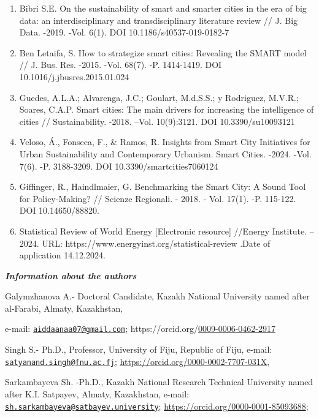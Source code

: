 {\begin{enumerate}
\def\labelenumi{\arabic{enumi}.}
\setcounter{enumi}{22}
\item
  Bibri S.E. On the sustainability of smart and smarter cities in the
  era of big data: an interdisciplinary and transdisciplinary literature
  review // J. Big Data. -2019. -Vol. 6(1). DOI
  10.1186/s40537-019-0182-7
\item
  Ben Letaifa, S. How to strategize smart cities: Revealing the SMART
  model // J. Bus. Res. -2015. -Vol. 68(7). -P. 1414-1419. DOI
  10.1016/j.jbusres.2015.01.024
\item
  Guedes, A.L.A.; Alvarenga, J.C.; Goulart, M.d.S.S.; y Rodriguez,
  M.V.R.; Soares, C.A.P. Smart cities: The main drivers for increasing
  the intelligence of cities // Sustainability. -2018. --Vol.
  10(9):3121. DOI 10.3390/su10093121
\item
  Veloso, Á., Fonseca, F., \& Ramos, R. Insights from Smart City
  Initiatives for Urban Sustainability and Contemporary Urbanism. Smart
  Cities. -2024. -Vol. 7(6). -P. 3188-3209. DOI
  10.3390/smartcities7060124
\item
  Giffinger, R., Haindlmaier, G. Benchmarking the Smart City: A Sound
  Tool for Policy-Making? // Scienze Regionali. - 2018. - Vol. 17(1).
  -P. 115-122. DOI 10.14650/88820.
\item
  Statistical Review of World Energy {[}Electronic resource{]} //Energy
  Institute. -- 2024. URL: https://www.energyinst.org/statistical-review
  .Date of application 14.12.2024.
\end{enumerate}

\emph{{\bfseries Information about the authors}}

Galymzhanova A.- Doctoral Candidate, Kazakh National University named
after al-Farabi, Almaty, Kazakhstan,

e-mail:
\href{mailto:aiddaanaa07@gmail.com}{\nolinkurl{aiddaanaa07@gmail.com}};
https://orcid.org/\href{https://orcid.org/0009-0006-0462-2917}{0009-0006-0462-2917}

Singh S.- Ph.D., Professor, University of Fiju, Republic of Fiju,
e-mail:
\href{mailto:satyanand.singh@fnu.ac.fj}{\nolinkurl{satyanand.singh@fnu.ac.fj}};
\url{https://orcid.org/0000-0002-7707-031X},

Sarkambayeva Sh. -Ph.D., Kazakh National Research Technical University
named after K.I. Satpayev, Almaty, Kazakhstan, e-mail:
\href{mailto:sh.sarkambayeva@satbayev.university}{\nolinkurl{sh.sarkambayeva@satbayev.university}};
\url{https://orcid.org/0000-0001-85093688};

}
